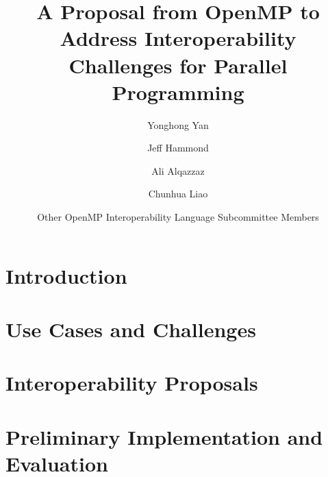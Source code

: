 \documentclass{llncs}
\begin{document}
%
\mainmatter              %
%
\title{A Proposal from OpenMP to Address Interoperability Challenges for Parallel Programming} %
%
\author{
    Yonghong Yan \and
    Jeff Hammond \and
    Ali Alqazzaz \and
    Chunhua Liao \and
    Other OpenMP Interoperability Language Subcommittee Members
}

\maketitle              %

\begin{abstract}

\end{abstract}
%

\section{Introduction}
\label{sec:intro}


\section{Use Cases and Challenges}
\label{sec:challenges}


\section{Interoperability Proposals}
\label{sec:proposal}


\section{Preliminary Implementation and Evaluation}
\label{sec:implementation}

\label{sec:results}
 
%
\end{document}

